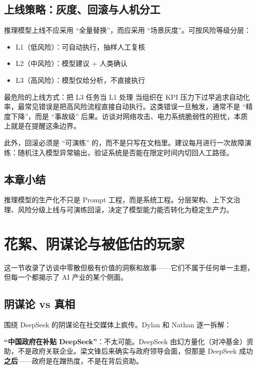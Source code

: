 \documentclass[a4paper]{article}
\begin{document}
\subsection{上线策略：灰度、回滚与人机分工}

推理模型上线不应采用 ``全量替换''，而应采用 ``场景灰度''。可按风险等级分层：
\begin{itemize}
    \item L1（低风险）：可自动执行，抽样人工复核
    \item L2（中风险）：模型建议 + 人类确认
    \item L3（高风险）：模型仅给分析，不直接执行
\end{itemize}

\begin{warningbox}{最危险的上线方式：把 L3 任务当 L1 处理}
当组织在 KPI 压力下过早追求自动化率，最常见错误是把高风险流程直接自动执行。这类错误一旦触发，通常不是 ``精度下降''，而是 ``事故级'' 后果。访谈对网络攻击、电力系统脆弱性的担忧，本质上就是在提醒这条边界。
\end{warningbox}

此外，回滚必须是 ``可演练'' 的，而不是只写在文档里。建议每月进行一次故障演练：随机注入模型异常输出，验证系统是否能在限定时间内切回人工路径。

\subsection{本章小结}

推理模型的生产化不只是 Prompt 工程，而是系统工程。分层架构、上下文治理、风险分级上线与可演练回滚，决定了模型能力能否转化为稳定生产力。

\section{花絮、阴谋论与被低估的玩家}

这一节收录了访谈中零散但极有价值的洞察和故事——它们不属于任何单一主题，但每一个都揭示了 AI 产业的某个侧面。

\subsection{阴谋论 vs 真相}

围绕 DeepSeek 的阴谋论在社交媒体上疯传。Dylan 和 Nathan 逐一拆解：

\textbf{``中国政府在补贴 DeepSeek''}：不太可能。DeepSeek 由幻方量化（对冲基金）资助，不是政府关联企业。梁文锋后来确实与政府领导会面，但那是 DeepSeek 成功\textbf{之后}——政府是在蹭热度，不是在背后资助。
\end{document}
